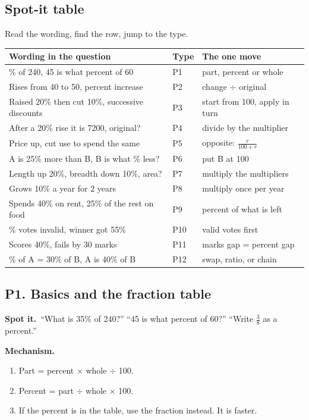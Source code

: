 \documentclass[11pt,a4paper]{article}
\let\oldsubsection\subsection
\renewcommand{\subsection}{\needspace{9\baselineskip}\oldsubsection}
\newcommand{\spot}{\textbf{\color{ember}Spot it.}\ }
\newcommand{\mech}{\textbf{\color{ember}Mechanism.}\ }
\begin{document}
\subsection*{Spot-it table}
Read the wording, find the row, jump to the type.
\begin{center}\small\renewcommand{\arraystretch}{1.18}\setlength{\tabcolsep}{7pt}
\begin{tabularx}{\linewidth}{@{}>{\raggedright\arraybackslash}X l >{\raggedright\arraybackslash}X@{}}
\toprule
\textbf{\color{slate}Wording in the question} & \textbf{\color{slate}Type} & \textbf{\color{slate}The one move} \\ \midrule
35\% of 240, 45 is what percent of 60 & P1 & part, percent or whole \\
Rises from 40 to 50, percent increase & P2 & change $\div$ original \\
Raised 20\% then cut 10\%, successive discounts & P3 & start from 100, apply in turn \\
After a 20\% rise it is 7200, original? & P4 & divide by the multiplier \\
Price up, cut use to spend the same & P5 & opposite: $\frac{r}{100+r}$ \\
A is 25\% more than B, B is what \% less? & P6 & put B at 100 \\
Length up 20\%, breadth down 10\%, area? & P7 & multiply the multipliers \\
Grows 10\% a year for 2 years & P8 & multiply once per year \\
Spends 40\% on rent, 25\% of the rest on food & P9 & percent of what is left \\
20\% votes invalid, winner got 55\% & P10 & valid votes first \\
Scores 40\%, fails by 30 marks & P11 & marks gap = percent gap \\
20\% of A = 30\% of B, A is 40\% of B & P12 & swap, ratio, or chain \\
\bottomrule
\end{tabularx}\end{center}

\subsection{P1. Basics and the fraction table}
\spot ``What is 35\% of 240?'' ``45 is what percent of 60?'' ``Write $\tfrac38$ as a percent.''

\mech
\begin{enumerate}
\item Part = percent $\times$ whole $\div$ 100.
\item Percent = part $\div$ whole $\times$ 100.
\item If the percent is in the table, use the fraction instead. It is faster.
\end{enumerate}
\end{document}
